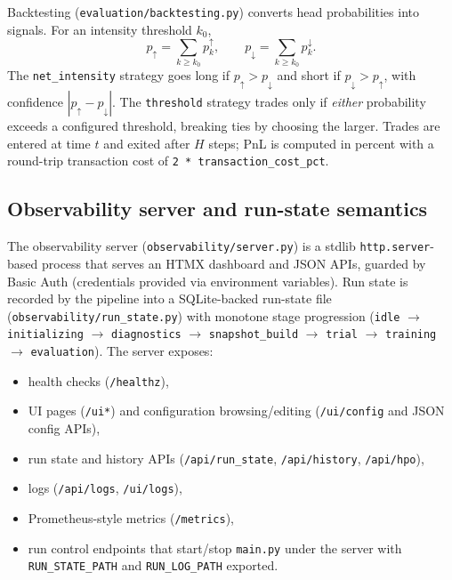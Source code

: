 \documentclass[11pt]{article}
\begin{document}
Backtesting (\texttt{evaluation/backtesting.py}) converts head probabilities into signals. For an intensity threshold $k_0$,
\begin{equation}
  p_{\uparrow} = \sum_{k\ge k_0} p^{\uparrow}_k,\qquad p_{\downarrow} = \sum_{k\ge k_0} p^{\downarrow}_k.
\end{equation}
The \texttt{net\_intensity} strategy goes long if $p_{\uparrow}>p_{\downarrow}$ and short if $p_{\downarrow}>p_{\uparrow}$, with confidence $|p_{\uparrow}-p_{\downarrow}|$. The \texttt{threshold} strategy trades only if \emph{either} probability exceeds a configured threshold, breaking ties by choosing the larger. Trades are entered at time $t$ and exited after $H$ steps; PnL is computed in percent with a round-trip transaction cost of \texttt{2 * transaction\_cost\_pct}.

\subsection{Observability server and run-state semantics}

The observability server (\texttt{observability/server.py}) is a stdlib \texttt{http.server}-based process that serves an HTMX dashboard and JSON APIs, guarded by Basic Auth (credentials provided via environment variables). Run state is recorded by the pipeline into a SQLite-backed run-state file (\texttt{observability/run\_state.py}) with monotone stage progression (\texttt{idle} $\rightarrow$ \texttt{initializing} $\rightarrow$ \texttt{diagnostics} $\rightarrow$ \texttt{snapshot\_build} $\rightarrow$ \texttt{trial} $\rightarrow$ \texttt{training} $\rightarrow$ \texttt{evaluation}). The server exposes:
\begin{itemize}
  \item health checks (\texttt{/healthz}),
  \item UI pages (\texttt{/ui*}) and configuration browsing/editing (\texttt{/ui/config} and JSON config APIs),
  \item run state and history APIs (\texttt{/api/run\_state}, \texttt{/api/history}, \texttt{/api/hpo}),
  \item logs (\texttt{/api/logs}, \texttt{/ui/logs}),
  \item Prometheus-style metrics (\texttt{/metrics}),
  \item run control endpoints that start/stop \texttt{main.py} under the server with \texttt{RUN\_STATE\_PATH} and \texttt{RUN\_LOG\_PATH} exported.
\end{itemize}
\end{document}
